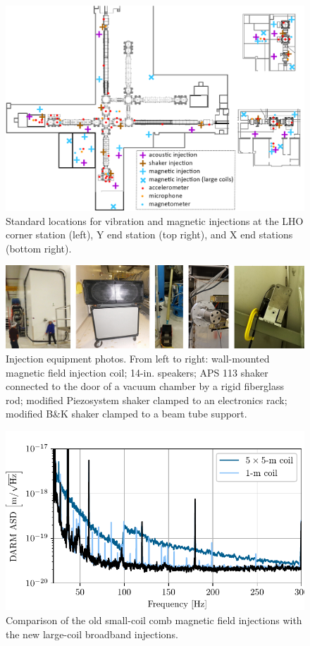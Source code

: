 \documentclass[11pt]{article}
\begin{document}
\begin{figure}[h!]
	\centering
	\includegraphics[width=\textwidth]{figures/injection-map.png}
	\caption{
		Standard locations for vibration and magnetic injections at the LHO corner station (left), Y end station (top right), and X end stations (bottom right).}
	\label{fig:injection-map}
\end{figure}

\begin{figure}[h!]
	\centering
	\includegraphics[width=\textwidth]{figures/injection-equipment.png}
	\caption{Injection equipment photos. From left to right: wall-mounted magnetic field injection coil; 14-in. speakers; APS 113 shaker connected to the door of a vacuum chamber by a rigid fiberglass rod; modified Piezosystem shaker clamped to an electronics rack; modified B\&K shaker clamped to a beam tube support.}
	\label{fig:injection-equipment}
\end{figure}


\begin{figure}[h!]
	\centering
	\includegraphics{figures/injection-wallcoil.pdf}
	\caption{
		Comparison of the old small-coil comb magnetic field injections with the new large-coil broadband injections.}
	\label{fig:injection-wallcoil}
\end{figure}
\end{document}
